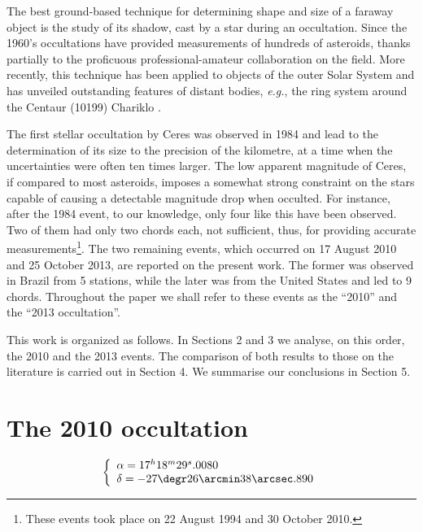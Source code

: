 \documentclass[useAMS,usenatbib]{mn2e}
\begin{document}
The best ground-based technique for determining shape and size of a faraway object is the study of its shadow, cast by a star during an occultation. Since the 1960's occultations have provided measurements of hundreds of asteroids, thanks partially to the proficuous professional-amateur collaboration on the field. More recently, this technique has been applied to objects of the outer Solar System and has unveiled outstanding features of distant bodies, \textit{e.g.}, the ring system around the Centaur (10199) Chariklo \citep{BragaRibas2014}.

The first stellar occultation by Ceres was observed in 1984 \citep{Millis1987} and lead to the determination of its size to the precision of the kilometre, at a time when the uncertainties were often ten times larger. The low apparent magnitude of Ceres, if compared to most asteroids, imposes a somewhat strong constraint on the stars capable of causing a detectable magnitude drop when occulted. For instance, after the 1984 event, to our knowledge, only four like this have been observed. Two of them had only two chords each, not sufficient, thus, for providing accurate measurements\footnote{These events took place on 22 August 1994 and 30 October 2010.}. The two remaining events, which occurred on 17 August 2010 and 25 October 2013, are reported on the present work. The former was observed in Brazil from 5 stations, while the later was from the United States and led to 9 chords. Throughout the paper we shall refer to these events as the ``2010'' and the ``2013 occultation''.

This work is organized as follows. In Sections 2 and 3 we analyse, on this order, the 2010 and the 2013 events. The comparison of both results to those on the literature is carried out in Section 4. We summarise our conclusions in Section 5.








\section[]{The 2010 occultation}

\begin{equation}
\left\{ 
  \begin{array}{l l}
    \alpha = 17^{h}18^{m}29^{s}.0080\\
    \delta = -27\degr 26\arcmin 38\arcsec.890
  \end{array}
\right.
\end{equation}
\end{document}
